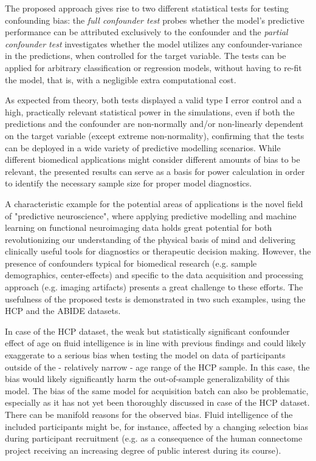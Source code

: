 \documentclass{article}
\begin{document}
The proposed approach gives rise to two different statistical tests for testing confounding bias: the \emph{full confounder test} probes whether the model's predictive performance can be attributed exclusively to the confounder and the \emph{partial confounder test} investigates whether the model utilizes any confounder-variance in the predictions, when controlled for the target variable. 
The tests can be applied for arbitrary classification or regression models, without having to re-fit the model, that is, with a negligible extra computational cost.

As expected from theory, both tests displayed a valid type I error control and a high, practically relevant statistical power in the simulations, even if both the predictions and the confounder are non-normally and/or non-linearly dependent on the target variable (except extreme non-normality), confirming that the tests can be deployed in a wide variety of predictive modelling scenarios. While different biomedical applications might consider different amounts of bias to be relevant, the presented results can serve as a basis for power calculation in order to identify the necessary sample size for proper model diagnostics.

A characteristic example for the potential areas of applications is the novel field of "predictive neuroscience", where applying predictive modelling and machine learning on functional neuroimaging data holds great potential for both revolutionizing our understanding of the physical basis of mind and delivering clinically useful tools for diagnostics or therapeutic decision making\citep{woo2017building, wager2013fmri, spisak2020pain}. However, the presence of confounders typical for biomedical research (e.g. sample demographics, center-effects) and specific to the data acquisition and processing approach (e.g. imaging artifacts) presents a great challenge to these efforts.
The usefulness of the proposed tests is demonstrated in two such examples, using the HCP\citep{van2013wu}  and the ABIDE\citep{di2014autism} datasets.


In case of the HCP dataset, the weak but statistically significant confounder effect of age on fluid intelligence is in line with previous findings\citep{dubois2018distributed, lohmann2021predicting} and could likely exaggerate to a serious bias when testing the model on data of participants outside of the - relatively narrow - age range of the HCP sample. In this case, the bias would likely significantly harm the out-of-sample generalizability of this model. The bias of the same model for acquisition batch can also be problematic, especially as it has not yet been thoroughly discussed in case of the HCP dataset. There can be manifold reasons for the observed bias. Fluid intelligence of the included participants might be, for instance, affected by a changing selection bias during participant recruitment (e.g. as a consequence of the human connectome project receiving an increasing degree of public interest during its course).
\end{document}
